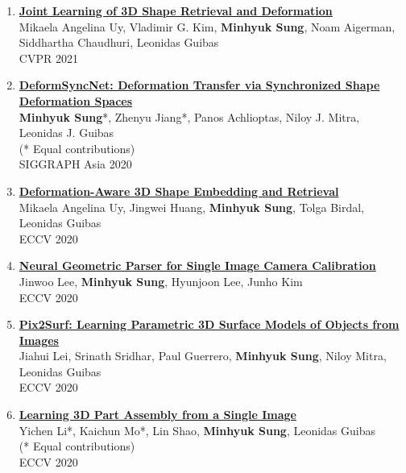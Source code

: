 \documentclass[letterpaper,10pt]{article} %
\newcommand{\blankline}{\quad\pagebreak[2]}
\begin{document}
{\begin{enumerate}
\item \label{cvpr21_1}
\href{https://joint-retrieval-deformation.github.io/}{\textbf{Joint Learning of 3D Shape Retrieval and Deformation}}\\
Mikaela Angelina Uy, Vladimir G. Kim, \textbf{Minhyuk Sung}, Noam Aigerman, Siddhartha Chaudhuri, Leonidas Guibas\\
CVPR 2021\\
\blankline

\item \label{siggraphasia20}
\href{https://mhsung.github.io/papers/deform-sync-net.html}{\textbf{DeformSyncNet: Deformation Transfer via Synchronized Shape Deformation Spaces}}\\
\textbf{Minhyuk Sung}*, Zhenyu Jiang*, Panos Achlioptas, Niloy J. Mitra, Leonidas J. Guibas\\
(* Equal contributions)\\
SIGGRAPH Asia 2020\\
\blankline

\item \label{eccv20_4}
\href{https://deformscan2cad.github.io/}{\textbf{Deformation-Aware 3D Shape Embedding and Retrieval}}\\
Mikaela Angelina Uy, Jingwei Huang, \textbf{Minhyuk Sung}, Tolga Birdal, Leonidas Guibas\\
ECCV 2020\\
\blankline

\item \label{eccv20_3}
\href{https://arxiv.org/abs/2007.11855}{\textbf{Neural Geometric Parser for Single Image Camera Calibration}}\\
Jinwoo Lee, \textbf{Minhyuk Sung}, Hyunjoon Lee, Junho Kim\\
ECCV 2020\\
\blankline

\item \label{eccv20_2}
\href{https://geometry.stanford.edu/projects/pix2surf/}{\textbf{Pix2Surf: Learning Parametric 3D Surface Models of Objects from Images}}\\
Jiahui Lei, Srinath Sridhar, Paul Guerrero, \textbf{Minhyuk Sung}, Niloy Mitra, Leonidas Guibas\\
ECCV 2020\\
\blankline

\item \label{eccv20_1}
\href{https://cs.stanford.edu/~kaichun/impartass/}{\textbf{Learning 3D Part Assembly from a Single Image}}\\
Yichen Li*, Kaichun Mo*, Lin Shao, \textbf{Minhyuk Sung}, Leonidas Guibas\\
(* Equal contributions)\\
ECCV 2020\\
\blankline


\end{enumerate}}
\end{document}
